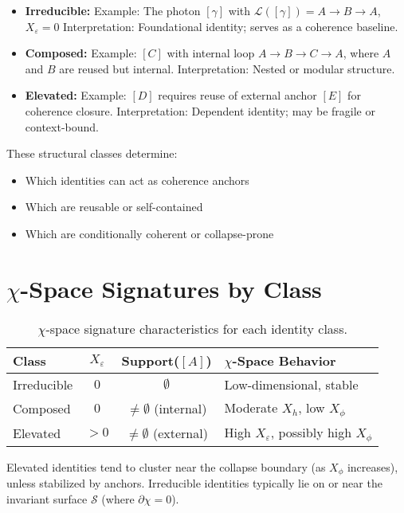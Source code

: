 \begin{itemize}
  \item \textbf{Irreducible:}  
  Example: The photon $[\gamma]$ with $\mathcal{L}([\gamma]) = A \rightarrow B \rightarrow A$, $X_\varepsilon = 0$  
  Interpretation: Foundational identity; serves as a coherence baseline.

  \item \textbf{Composed:}  
  Example: $[C]$ with internal loop $A \rightarrow B \rightarrow C \rightarrow A$, where $A$ and $B$ are reused but internal.  
  Interpretation: Nested or modular structure.

  \item \textbf{Elevated:}  
  Example: $[D]$ requires reuse of external anchor $[E]$ for coherence closure.  
  Interpretation: Dependent identity; may be fragile or context-bound.
\end{itemize}

These structural classes determine:
\begin{itemize}
  \item Which identities can act as coherence anchors
  \item Which are reusable or self-contained
  \item Which are conditionally coherent or collapse-prone
\end{itemize}

\section{$\chi$-Space Signatures by Class} \label{chi-space-signatures-by-class}

\begin{table}[h!]
\centering
\begin{tabular}{l c c l}
\toprule
\textbf{Class} & \textbf{$X_\varepsilon$} & \textbf{Support($[A]$)} & \textbf{$\chi$-Space Behavior} \\
\midrule
Irreducible & $0$ & $\emptyset$ & Low-dimensional, stable \\
Composed    & $0$ & $\ne \emptyset$ (internal) & Moderate $X_h$, low $X_\phi$ \\
Elevated    & $> 0$ & $\ne \emptyset$ (external) & High $X_\varepsilon$, possibly high $X_\phi$ \\
\bottomrule
\end{tabular}
\caption{$\chi$-space signature characteristics for each identity class.}
\end{table}

Elevated identities tend to cluster near the collapse boundary (as $X_\phi$ increases),  
unless stabilized by anchors. Irreducible identities typically lie on or near the invariant surface $\mathcal{S}$ (where $\partial \chi = 0$).

